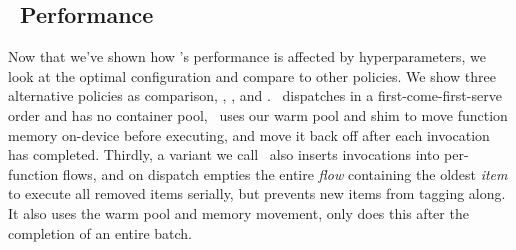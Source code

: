 \subsection{\QName~Performance}
\label{sec:queue-perf}

Now that we've shown how \QName's performance is affected by hyperparameters, we look at the optimal configuration and compare to other policies.
We show three alternative policies as comparison, \naive, \fcfs, and \batch.
\naive~dispatches in a first-come-first-serve order and has no container pool, \fcfs~uses our warm pool and shim to move function memory on-device before executing, and move it back off after each invocation has completed.
Thirdly, a variant we call \batch~also inserts invocations into per-function flows, and on dispatch empties the entire \emph{flow} containing the oldest \emph{item} to execute all removed items serially, but prevents new items from tagging along.
It also uses the warm pool and memory movement, only does this after the completion of an entire batch.

